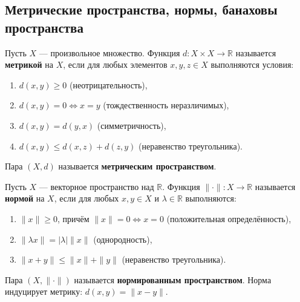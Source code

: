 \documentclass[../NDCNNAI_main.tex]{subfiles}
\begin{document}
\subsection{Метрические пространства, нормы, банаховы пространства}

\begin{definition}
    Пусть \( X \) --- произвольное множество. Функция \( d: X \times X \to \mathbb{R} \) называется \textbf{метрикой} на \( X \), если для любых элементов \( x, y, z \in X \) выполняются условия:
    \begin{enumerate}
        \item \( d(x, y) \ge 0 \) (неотрицательность),
        \item \( d(x, y) = 0 \iff x = y \) (тождественность неразличимых),
        \item \( d(x, y) = d(y, x) \) (симметричность),
        \item \( d(x, y) \le d(x, z) + d(z, y) \) (неравенство треугольника).
    \end{enumerate}
    Пара \( (X, d) \) называется \textbf{метрическим пространством}.
\end{definition}

\begin{definition}
    Пусть \( X \) --- векторное пространство над \( \mathbb{R} \). Функция \( \|\cdot\|: X \to \mathbb{R} \) называется \textbf{нормой} на \( X \), если для любых \( x, y \in X \) и \( \lambda \in \mathbb{R} \) выполняются:
    \begin{enumerate}
        \item \( \|x\| \ge 0 \), причём \( \|x\| = 0 \iff x = 0 \) (положительная определённость),
        \item \( \|\lambda x\| = |\lambda| \|x\| \) (однородность),
        \item \( \|x + y\| \le \|x\| + \|y\| \) (неравенство треугольника).
    \end{enumerate}
    Пара \( (X, \|\cdot\|) \) называется \textbf{нормированным пространством}. Норма индуцирует метрику: \( d(x, y) = \|x - y\| \).
\end{definition}
\end{document}
